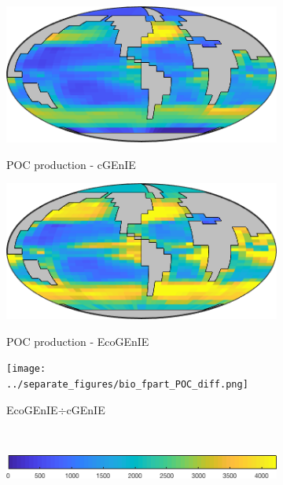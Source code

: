 \documentclass{article}
\begin{document}
\begin{figure}[htp]
 \centering
\begin{subfigure}{.33\textwidth}
 \caption{POC production - cGEnIE}
 \includegraphics[width=0.95\linewidth]{../separate_figures/BIOGEM/bio_fpart_POC.png}
 \label{fig:dpCO2_1}
\end{subfigure}%
\begin{subfigure}{.33\textwidth}
 \caption{POC production - EcoGEnIE}
 \includegraphics[width=0.95\linewidth]{../separate_figures/ECOGEM/bio_fpart_POC.png}
 \label{fig:dpCO2_2}
\end{subfigure}
\begin{subfigure}{.33\textwidth}
 \centering
 \caption{EcoGEnIE$\div$cGEnIE}
\texttt{[image: ../separate\_figures/bio\_fpart\_POC\_diff.png]}
 \label{fig:dpCO2_2}
\end{subfigure}
\\[+0.2cm]
\begin{subfigure}{.49\textwidth}
 \centering
 \includegraphics[width=0.95\linewidth]{../separate_figures/ECOGEM/bio_fpart_POC_clrbr.png}

\end{subfigure}
\end{figure}
\end{document}
